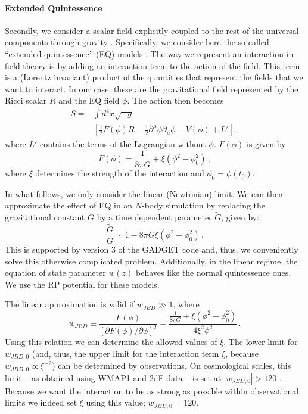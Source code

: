 \paragraph*{Extended Quintessence}
Secondly, we consider a scalar field explicitly coupled to the rest of the universal components through gravity \citep{boisseau00}. Specifically, we consider here the so-called ``extended quintessence'' (EQ) models \citep{pettorino08}. The way we represent an interaction in field theory is by adding an interaction term to the action of the field. This term is a (Lorentz invariant) product of the quantities that represent the fields that we want to interact. In our case, these are the gravitational field represented by the Ricci scalar $R$ and the EQ field $\phi$. The action then becomes \citep{baccigalupi00}
\begin{equation}
\begin{split}
S = &\int d^4x \sqrt{-g} \\
    &\left[ \frac{1}{2} F(\phi)R - \frac{1}{2}\partial^\mu\phi\partial_\mu\phi - V(\phi) + L' \right] \,,
\end{split}
\end{equation}
where $L'$ contains the terms of the Lagrangian without $\phi$. $F(\phi)$ is given by
\begin{equation}
 F(\phi) = \frac{1}{8\pi G} + \xi \left(\phi^2 - \phi_0^2\right) \,,
\end{equation}
where $\xi$ determines the strength of the interaction and $\phi_0 = \phi(t_0)$.

In what follows, we only consider the linear (Newtonian) limit. We can then approximate the effect of EQ in an $N$-body simulation by replacing the gravitational constant $G$ by a time dependent parameter $\tilde{G}$, given by:
\begin{equation}
	\frac{\tilde{G}}G \sim 1 - 8\pi G \xi (\phi^2 - \phi_0^2) \,.
\end{equation}
This is supported by version 3 of the GADGET code and, thus, we conveniently solve this otherwise complicated problem. Additionally, in the linear regime, the equation of state parameter $w(z)$ behaves like the normal quintessence ones. We use the RP potential for these models.

The linear approximation is valid if $w_{JBD} \gg 1$, where
\begin{equation}
\label{eqn:wJBD}
 w_{JBD} \equiv \frac{F(\phi)}{\left[\partial F(\phi)/\partial \phi\right]^2} = \frac{\frac{1}{8\pi G} + \xi \left(\phi^2 - \phi_0^2\right)}{4\xi^2\phi^2} \,.
\end{equation}
Using this relation we can determine the allowed values of $\xi$. The lower limit for $w_{JBD,0}$ (and, thus, the upper limit for the interaction term $\xi$, because $w_{JBD,0} \propto \xi^{-2}$) can be determined by observations. On cosmological scales, this limit -- as obtained using WMAP1 and 2dF data -- is set at $\left|w_{JBD,0}\right| > 120$ \citep{acquaviva05}. Because we want the interaction to be as strong as possible within observational limits we indeed set $\xi$ using this value; $w_{JBD,0} = 120$.

